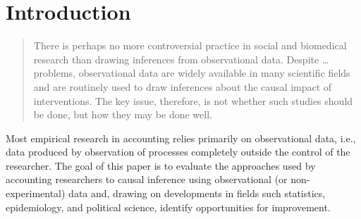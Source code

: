 \documentclass[11pt]{amsart}
\begin{document}
\clearpage

 
\section{Introduction}

\begin{quotation}
	There is perhaps no more controversial practice in social and biomedical research than drawing inferences from observational data.
	Despite \dots problems, observational data are widely available in many scientific fields and are routinely used to draw inferences about the causal impact of interventions.
	The key issue, therefore, is not whether such studies should be done, but how they may be done well.
\end{quotation}


Most empirical research in accounting relies primarily on observational data, i.e., data produced by observation of processes completely outside the control of the researcher. The goal of this paper is to evaluate the approaches used by accounting researchers to causal inference using observational (or non-experimental) data and, drawing on developments in fields such statistics, epidemiology, and political science, identify opportunities for improvement.
\end{document}
